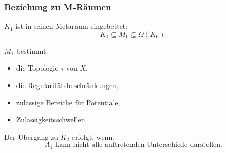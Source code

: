 \subsubsection{Beziehung zu M-Räumen}

$K_1$ ist in seinen Metaraum eingebettet:
\[
K_1 \subseteq M_1 \subseteq \Omega(K_0).
\]

$M_1$ bestimmt:
\begin{itemize}
    \item die Topologie $\tau$ von $X$,
    \item die Regularitätsbeschränkungen,
    \item zulässige Bereiche für Potentiale,
    \item Zulässigkeitsschwellen.
\end{itemize}

Der Übergang zu $K_2$ erfolgt, wenn:
\[
A_1 \text{ kann nicht alle auftretenden Unterschiede darstellen.}
\]
